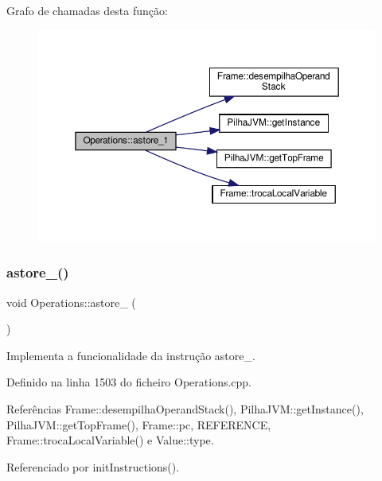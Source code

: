 Grafo de chamadas desta função\+:\nopagebreak
\begin{figure}[H]
\begin{center}
\leavevmode
\includegraphics[width=350pt]{classOperations_a1a7a41be018313dd524df5327c8b6035_cgraph}
\end{center}
\end{figure}
\mbox{\label{classOperations_a01e238bbea0f9d61d80a8fcd3ed2f660}} 
\subsubsection{\texorpdfstring{astore\+\_()}{astore\_2()}}
{\footnotesize\ttfamily void Operations\+::astore\+\_ (\begin{DoxyParamCaption}{ }\end{DoxyParamCaption})\hspace{0.3cm}{\ttfamily [private]}}



Implementa a funcionalidade da instrução astore\+\_. 



Definido na linha 1503 do ficheiro Operations.\+cpp.



Referências Frame\+::desempilha\+Operand\+Stack(), Pilha\+J\+V\+M\+::get\+Instance(), Pilha\+J\+V\+M\+::get\+Top\+Frame(), Frame\+::pc, R\+E\+F\+E\+R\+E\+N\+CE, Frame\+::troca\+Local\+Variable() e Value\+::type.



Referenciado por init\+Instructions().

